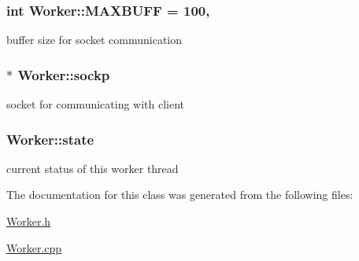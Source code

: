 \subsubsection[{M\+A\+X\+B\+U\+F\+F}]{\setlength{\rightskip}{0pt plus 5cm}int Worker\+::\+M\+A\+X\+B\+U\+F\+F = 100\hspace{0.3cm}{\ttfamily [static]}, {\ttfamily [protected]}}\label{classWorker_a2749db22d3591fe663b9a25e90a88e9d}
buffer size for socket communication \hypertarget{classWorker_a4562eb405aea20c7ac8a552e2075898f}{}
\subsubsection[{sockp}]{$\ast$ Worker\+::sockp\hspace{0.3cm}{\ttfamily [protected]}}\label{classWorker_a4562eb405aea20c7ac8a552e2075898f}
socket for communicating with client \hypertarget{classWorker_aeb90d4cd08a8a4759749c5388be8c78d}{}
\subsubsection[{state}]{ Worker\+::state\hspace{0.3cm}{\ttfamily [protected]}}\label{classWorker_aeb90d4cd08a8a4759749c5388be8c78d}
current status of this worker thread 

The documentation for this class was generated from the following files\+:\begin{DoxyCompactItemize}
\item 
\hyperlink{Worker_8h}{Worker.\+h}\item 
\hyperlink{Worker_8cpp}{Worker.\+cpp}\end{DoxyCompactItemize}
